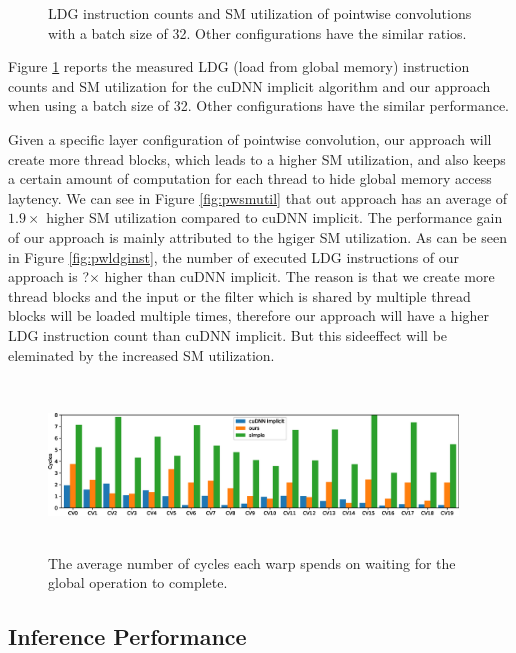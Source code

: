 \begin{figure}
    \vspace{-4mm}
    \caption{LDG instruction counts and SM utilization of pointwise convolutions with a batch size of 32. 
    Other configurations have the similar ratios.}
    \label{fig:pwratio}
\end{figure}
Figure \ref{fig:pwratio} reports the measured LDG (load from global memory) instruction counts and SM utilization for the cuDNN implicit algorithm and our approach when using a batch size of 32. Other configurations have the similar performance. 

Given a specific layer configuration of pointwise convolution, our approach will create more thread blocks, which leads to a higher SM utilization, and also keeps a certain amount of computation for each thread to hide global memory access laytency.
We can see in Figure \ref{fig:pwsmutil} that out approach has an average of $1.9\times$ higher SM utilization compared to cuDNN implicit. 
The performance gain of our approach is mainly attributed to the hgiger SM utilization.
As can be seen in Figure \ref{fig:pwldginst}, the number of executed LDG instructions of our approach is ?$\times$ higher than cuDNN implicit. 
The reason is that we create more thread blocks and the input or the filter which is shared by multiple thread blocks will be loaded multiple times, therefore our approach will have a higher LDG instruction count than cuDNN implicit.
But this sideeffect will be eleminated by the increased SM utilization.


\begin{figure}
    \centering
    \includegraphics[width=0.97\textwidth,height=4.5cm]{./figure/longscore.eps}
    \caption{The average number of cycles each warp spends on waiting for the global operation to complete.}
    \label{fig:stalllongscore}
\end{figure}


\subsection{Inference Performance}
